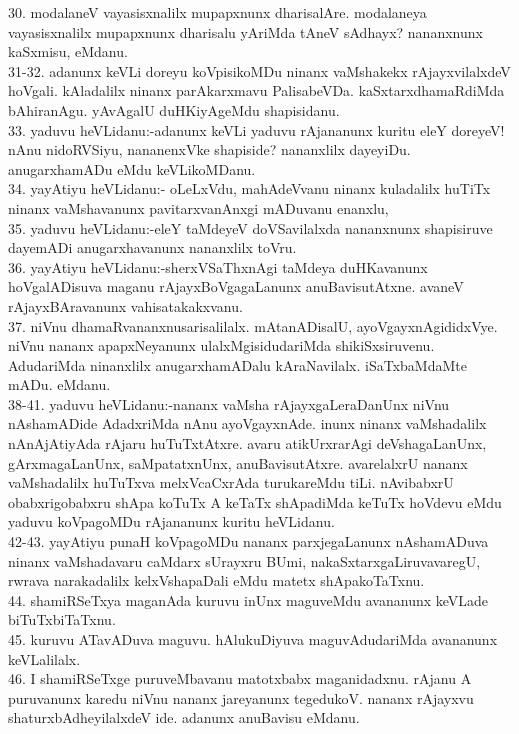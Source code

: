 \documentclass{article}
\begin{document}
30. modalaneV vayasisxnalilx mupapxnunx dharisalAre. modalaneya vayasisxnalilx mupapxnunx dharisalu yAriMda tAneV sAdhayx? nananxnunx kaSxmisu, eMdanu.\\
31-32. adanunx keVLi doreyu koVpisikoMDu ninanx vaMshakekx rAjayxvilalxdeV hoVgali. kAladalilx ninanx parAkarxmavu PalisabeVDa. kaSxtarxdhamaRdiMda bAhiranAgu. yAvAgalU duHKiyAgeMdu shapisidanu.\\
33. yaduvu heVLidanu:-adanunx keVLi yaduvu rAjananunx kuritu eleY doreyeV! nAnu nidoRVSiyu, nananenxVke shapiside? nananxlilx dayeyiDu. anugarxhamADu eMdu keVLikoMDanu.\\
34. yayAtiyu heVLidanu:- oLeLxVdu, mahAdeVvanu ninanx kuladalilx huTiTx ninanx vaMshavanunx pavitarxvanAnxgi mADuvanu enanxlu,\\
35. yaduvu heVLidanu:-eleY taMdeyeV doVSavilalxda nananxnunx shapisiruve dayemADi anugarxhavanunx nananxlilx toVru.\\
36. yayAtiyu heVLidanu:-sherxVSaThxnAgi taMdeya duHKavanunx hoVgalADisuva maganu rAjayxBoVgagaLanunx anuBavisutAtxne. avaneV rAjayxBAravanunx vahisatakakxvanu.\\
37. niVnu dhamaRvananxnusarisalilalx. mAtanADisalU, ayoVgayxnAgididxVye. niVnu nananx apapxNeyanunx ulalxMgisidudariMda shikiSxsiruvenu. AdudariMda ninanxlilx anugarxhamADalu kAraNavilalx. iSaTxbaMdaMte mADu. eMdanu.\\
38-41. yaduvu heVLidanu:-nananx vaMsha rAjayxgaLeraDanUnx niVnu nAshamADide AdadxriMda nAnu ayoVgayxnAde. inunx ninanx vaMshadalilx nAnAjAtiyAda rAjaru huTuTxtAtxre. avaru atikUrxrarAgi deVshagaLanUnx, gArxmagaLanUnx, saMpatatxnUnx, anuBavisutAtxre. avarelalxrU nananx vaMshadalilx huTuTxva melxVcaCxrAda turukareMdu tiLi. nAvibabxrU obabxrigobabxru shApa koTuTx A keTaTx shApadiMda keTuTx hoVdevu eMdu yaduvu koVpagoMDu rAjananunx kuritu heVLidanu.\\
42-43. yayAtiyu punaH koVpagoMDu nananx parxjegaLanunx nAshamADuva ninanx vaMshadavaru caMdarx sUrayxru BUmi, nakaSxtarxgaLiruvavaregU, rwrava narakadalilx kelxVshapaDali eMdu matetx shApakoTaTxnu.\\
44. shamiRSeTxya maganAda kuruvu inUnx maguveMdu avananunx keVLade biTuTxbiTaTxnu.\\
45. kuruvu ATavADuva maguvu. hAlukuDiyuva maguvAdudariMda avananunx keVLalilalx.\\
46. I shamiRSeTxge puruveMbavanu matotxbabx maganidadxnu. rAjanu A puruvanunx karedu niVnu nananx jareyanunx tegedukoV. nananx rAjayxvu shaturxbAdheyilalxdeV ide. adanunx anuBavisu eMdanu.\\
\end{document}
